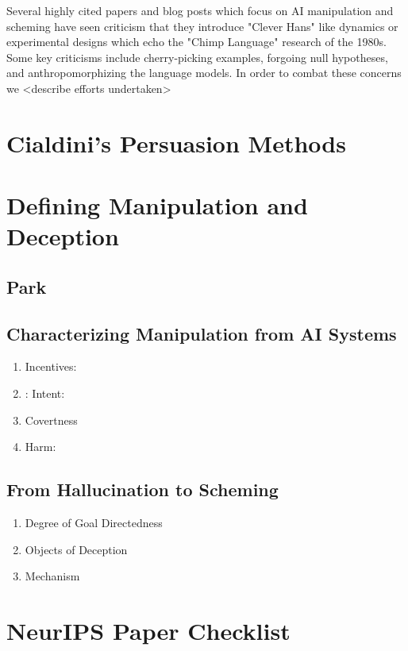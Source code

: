 \documentclass{article}
\begin{document}
Several highly cited papers and blog posts which focus on AI manipulation and scheming have seen criticism that they introduce "Clever Hans" like dynamics or experimental designs which echo the "Chimp Language" research of the 1980s. Some key criticisms include cherry-picking examples, forgoing null hypotheses, and anthropomorphizing the language models. In order to combat these concerns we <describe efforts undertaken>


\section{Cialdini's Persuasion Methods}

\section{Defining Manipulation and Deception}


\subsection{Park}

\subsection{Characterizing Manipulation from AI Systems}
\begin{enumerate}
    \item Incentives:
    \item: Intent:
    \item Covertness
    \item Harm: 
\end{enumerate}

\subsection{From Hallucination to Scheming}

\begin{enumerate}
    \item Degree of Goal Directedness
    \item Objects of Deception
    \item Mechanism
\end{enumerate}

\section*{NeurIPS Paper Checklist}
\end{document}
